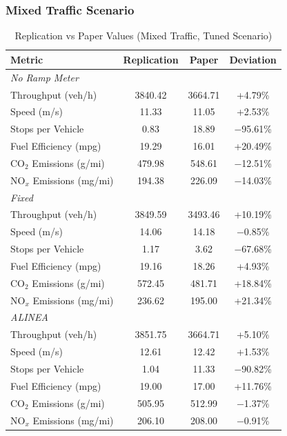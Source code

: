 \subsubsection{Mixed Traffic Scenario}

\begin{table}[H]
\centering
\small
\caption{Replication vs Paper Values (Mixed Traffic, Tuned Scenario)}
\begin{tabular}{l c c c}
\toprule
\textbf{Metric} & \textbf{Replication} & \textbf{Paper} & \textbf{Deviation} \\
\midrule
\multicolumn{4}{l}{\textit{No Ramp Meter}} \\
\midrule
Throughput (veh/h)       & 3840.42 & 3664.71 & +4.79\% \\
Speed (m/s)              & 11.33   & 11.05   & +2.53\% \\
Stops per Vehicle        & 0.83    & 18.89   & $-$95.61\% \\
Fuel Efficiency (mpg)    & 19.29   & 16.01   & +20.49\% \\
CO$_2$ Emissions (g/mi)  & 479.98  & 548.61  & $-$12.51\% \\
NO$_x$ Emissions (mg/mi) & 194.38  & 226.09  & $-$14.03\% \\
\midrule
\multicolumn{4}{l}{\textit{Fixed}} \\
\midrule
Throughput (veh/h)       & 3849.59 & 3493.46 & +10.19\% \\
Speed (m/s)              & 14.06   & 14.18   & $-$0.85\% \\
Stops per Vehicle        & 1.17    & 3.62    & $-$67.68\% \\
Fuel Efficiency (mpg)    & 19.16   & 18.26   & +4.93\% \\
CO$_2$ Emissions (g/mi)  & 572.45  & 481.71  & +18.84\% \\
NO$_x$ Emissions (mg/mi) & 236.62  & 195.00  & +21.34\% \\
\midrule
\multicolumn{4}{l}{\textit{ALINEA}} \\
\midrule
Throughput (veh/h)       & 3851.75 & 3664.71 & +5.10\% \\
Speed (m/s)              & 12.61   & 12.42   & +1.53\% \\
Stops per Vehicle        & 1.04    & 11.33   & $-$90.82\% \\
Fuel Efficiency (mpg)    & 19.00   & 17.00   & +11.76\% \\
CO$_2$ Emissions (g/mi)  & 505.95  & 512.99  & $-$1.37\% \\
NO$_x$ Emissions (mg/mi) & 206.10  & 208.00  & $-$0.91\% \\
\bottomrule
\end{tabular}
\end{table}

